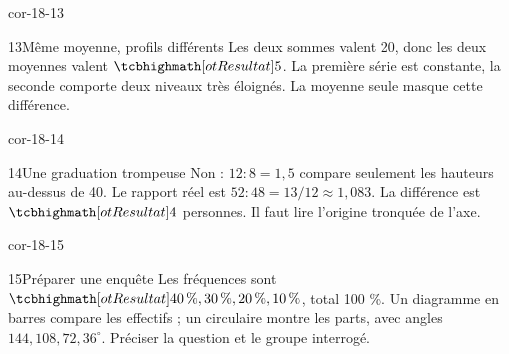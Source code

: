 \begin{blocLivre}{cor-18-13}\begin{corrige}{13}{Même moyenne, profils différents}
Les deux sommes valent 20, donc les deux moyennes valent $\res5$. La première série est constante, la seconde comporte deux niveaux très éloignés. La moyenne seule masque cette différence.
\end{corrige}\end{blocLivre}
\begin{blocLivre}{cor-18-14}\begin{corrige}{14}{Une graduation trompeuse}
Non : $12:8=1{,}5$ compare seulement les hauteurs au-dessus de 40. Le rapport réel est $52:48=13/12\approx1{,}083$. La différence est $\res4$ personnes. Il faut lire l’origine tronquée de l’axe.
\label{fig-cor-18-14}
\end{corrige}\end{blocLivre}
\begin{blocLivre}{cor-18-15}\begin{corrige}{15}{Préparer une enquête}
Les fréquences sont $\res{40\,\%,30\,\%,20\,\%,10\,\%}$, total 100 \%. Un diagramme en barres compare les effectifs ; un circulaire montre les parts, avec angles $144,108,72,36^\circ$. Préciser la question et le groupe interrogé.
\label{fig-cor-18-15}
\end{corrige}\end{blocLivre}
